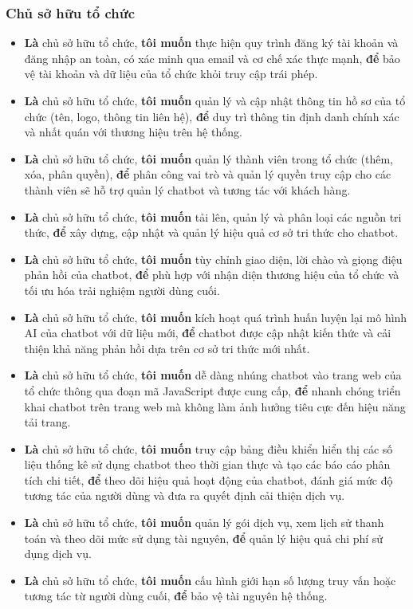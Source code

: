 \subsubsection{Chủ sở hữu tổ chức}
\begin{itemize}
    \item \textbf{Là} chủ sở hữu tổ chức, \textbf{tôi muốn} thực hiện quy trình đăng ký tài khoản và đăng nhập an toàn, có xác minh qua email và cơ chế xác thực mạnh, \textbf{để} bảo vệ tài khoản và dữ liệu của tổ chức khỏi truy cập trái phép.
    \item \textbf{Là} chủ sở hữu tổ chức, \textbf{tôi muốn} quản lý và cập nhật thông tin hồ sơ của tổ chức (tên, logo, thông tin liên hệ), \textbf{để} duy trì thông tin định danh chính xác và nhất quán với thương hiệu trên hệ thống.
    \item \textbf{Là} chủ sở hữu tổ chức, \textbf{tôi muốn} quản lý thành viên trong tổ chức (thêm, xóa, phân quyền), \textbf{để} phân công vai trò và quản lý quyền truy cập cho các thành viên sẽ hỗ trợ quản lý chatbot và tương tác với khách hàng.
    \item \textbf{Là} chủ sở hữu tổ chức, \textbf{tôi muốn} tải lên, quản lý và phân loại các nguồn tri thức, \textbf{để} xây dựng, cập nhật và quản lý hiệu quả cơ sở tri thức cho chatbot.
    \item \textbf{Là} chủ sở hữu tổ chức, \textbf{tôi muốn} tùy chỉnh giao diện, lời chào và giọng điệu phản hồi của chatbot, \textbf{để} phù hợp với nhận diện thương hiệu của tổ chức và tối ưu hóa trải nghiệm người dùng cuối.
    \item \textbf{Là} chủ sở hữu tổ chức, \textbf{tôi muốn} kích hoạt quá trình huấn luyện lại mô hình AI của chatbot với dữ liệu mới, \textbf{để} chatbot được cập nhật kiến thức và cải thiện khả năng phản hồi dựa trên cơ sở tri thức mới nhất.
    \item \textbf{Là} chủ sở hữu tổ chức, \textbf{tôi muốn} dễ dàng nhúng chatbot vào trang web của tổ chức thông qua đoạn mã JavaScript được cung cấp, \textbf{để} nhanh chóng triển khai chatbot trên trang web mà không làm ảnh hưởng tiêu cực đến hiệu năng tải trang.
    \item \textbf{Là} chủ sở hữu tổ chức, \textbf{tôi muốn} truy cập bảng điều khiển hiển thị các số liệu thống kê sử dụng chatbot theo thời gian thực và tạo các báo cáo phân tích chi tiết, \textbf{để} theo dõi hiệu quả hoạt động của chatbot, đánh giá mức độ tương tác của người dùng và đưa ra quyết định cải thiện dịch vụ.
    \item \textbf{Là} chủ sở hữu tổ chức, \textbf{tôi muốn} quản lý gói dịch vụ, xem lịch sử thanh toán và theo dõi mức sử dụng tài nguyên, \textbf{để} quản lý hiệu quả chi phí sử dụng dịch vụ.
    \item \textbf{Là} chủ sở hữu tổ chức, \textbf{tôi muốn} cấu hình giới hạn số lượng truy vấn hoặc tương tác từ người dùng cuối, \textbf{để} bảo vệ tài nguyên hệ thống.
\end{itemize}

